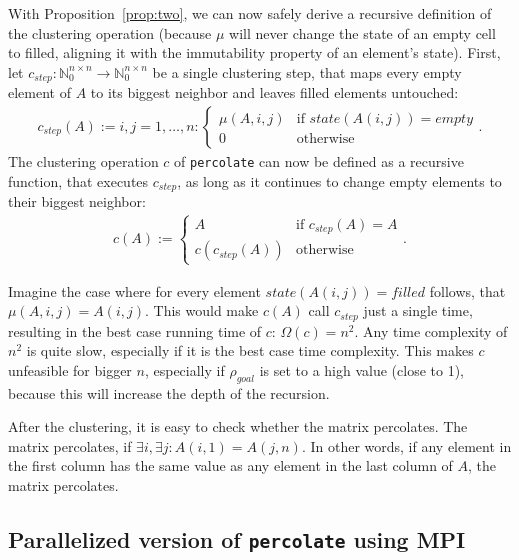 \documentclass[twoside,11pt]{article}
\def\perc{\texttt{perco\-late}}
\begin{document}
With Proposition~\ref{prop:two}, we can now safely derive
a recursive definition of the clustering operation (because
$\mu$ will never change the state of an empty cell to
filled, aligning it with the immutability property of an
element's state).
First, let $c_{step}:\mathbb{N}_0^{n \times n} \rightarrow
\mathbb{N}_0^{n \times n}$ be a single clustering step,
that maps every empty element of $A$ to its biggest
neighbor and leaves filled elements untouched:
\begin{align*}
  c_{step}(A) := i,j=1,\dots,n: \begin{cases}
    \mu(A, i, j) &\text{if } state(A(i, j)) = empty \\
    0 &\text{otherwise}
  \end{cases}.
\end{align*}
The clustering operation $c$ of \perc{} can now be defined
as a recursive function, that executes $c_{step}$, as long
as it continues to change empty elements to their biggest
neighbor:
\begin{align*}
  c(A) := \begin{cases}
    A &\text{if } c_{step}(A) = A \\
    c(c_{step}(A)) &\text{otherwise}
  \end{cases}.
\end{align*}

Imagine the case where for every element
$state(A(i,j)) = filled$ follows, that
$\mu(A, i, j) = A(i, j)$.
This would make $c(A)$ call $c_{step}$ just a single time,
resulting in the best case running time of $c$:
$\Omega(c) = n^2$.
Any time complexity of $n^2$ is quite slow, especially
if it is the best case time complexity.
This makes $c$ unfeasible for bigger $n$, especially if
$\rho_{goal}$ is set to a high value (close to 1), because
this will increase the depth of the recursion.

After the clustering, it is easy to check whether the
matrix percolates.
The matrix percolates, if $\exists i, \exists j: A(i,1) =
A(j,n)$.
In other words, if any element in the first column has the
same value as any element in the last column of $A$, the
matrix percolates.



\subsection{Parallelized version of \perc{} using MPI}
\end{document}
